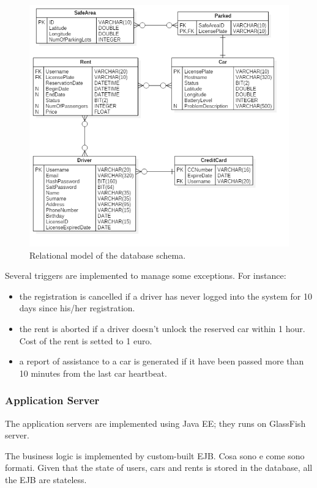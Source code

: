 \begin{figure}[H]
	\centering
	\includegraphics[width=\textwidth, keepaspectratio]{diagrams/Relational.png}
	\caption{Relational model of the database schema.}
	\label {fig:relational}
\end{figure}

Several triggers are implemented to manage some exceptions. For instance:
\begin{itemize}
	\item the registration is cancelled if a driver has never logged into the system for 10 days since his/her registration.
	\item the rent is aborted if a driver doesn't unlock the reserved car within 1 hour. Cost of the rent is setted to 1 euro.
	\item a report of assistance to a car is generated if it have been passed more than 10 minutes from the last car heartbeat.
\end{itemize}

\subsubsection{Application Server}

The application servers are implemented using Java EE; they runs on GlassFish server.

The business logic is implemented by custom-built EJB. Cosa sono e come sono formati. Given that the state of users, cars and rents is stored in the database, all the EJB are stateless.

